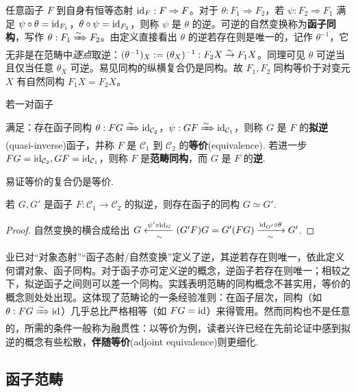 任意函子 $F$ 到自身有恒等态射 $\mathrm{id}_F : F \Rightarrow F$。对于 $\theta: F_1 \Rightarrow F_2$，若 $\psi: F_2 \Rightarrow F_1$ 满足 $\psi \circ \theta = \mathrm{id}_{F_1}$，$\theta \circ \psi = \mathrm{id}_{F_2}$，则称 $\psi$ 是 $\theta$ 的逆。可逆的自然变换称为\textbf{函子同构}，写作 $\theta: F_1 \xRightarrow{\sim} F_2$。由定义直接看出 $\theta$ 的逆若存在则是唯一的，记作 $\theta^{-1}$，它无非是在范畴中\emph{逐点}取逆：$(\theta^{-1})_X := (\theta_X)^{-1}: F_2 X \stackrel{\sim}{\rightarrow} F_1 X$。同理可见 $\theta$ 可逆当且仅当任意 $\theta_X$ 可逆。易见同构的纵横复合仍是同构。故 $F_1,F_2$ 同构等价于对变元 $X$ 有自然同构 $F_1 X= F_2 X$。

\begin{definition}
	若一对函子
	满足：存在函子同构 $\theta: FG \xRightarrow{\sim} \mathrm{id}_{\mathcal{C}_2}$，$\psi: GF \xRightarrow{\sim} \mathrm{id}_{\mathcal{C}_1}$，则称 $G$ 是 $F$ 的\textbf{拟逆}(quasi-inverse)函子，并称 $F$ 是 $\mathcal{C}_1$ 到 $\mathcal{C}_2$ 的\textbf{等价}(equivalence).
	若进一步 $FG = \mathrm{id}_{\mathcal{C}_2}, GF = \mathrm{id}_{\mathcal{C}_1}$，则称 $F$ 是\textbf{范畴同构}，而 $G$ 是 $F$ 的\textbf{逆}.
\end{definition}
易证等价的复合仍是等价.

\begin{proposition}
	若 $G, G'$ 是函子 $F: \mathcal{C}_1 \to \mathcal{C}_2$ 的拟逆，则存在函子的同构 $G \simeq G'$.
\end{proposition}
\begin{proof}
	自然变换的横合成给出 $G \xleftarrow[\sim]{\psi' \circ \mathrm{id}_G} (G'F)G = G'(FG) \xrightarrow[\sim]{\mathrm{id}_{G'} \circ \theta} G'$.
\end{proof}

\begin{remark}
	业已对“对象态射”“函子态射/自然变换”定义了逆，其逆若存在则唯一，依此定义何谓对象、函子同构。对于函子亦可定义逆的概念，逆函子若存在则唯一；相较之下，拟逆函子之间则可以差一个同构。实践表明范畴的同构概念不甚实用，等价的概念则处处出现。这体现了范畴论的一条经验准则：在函子层次，同构（如 $\theta: FG \xRightarrow{\sim} \mathrm{id}$）几乎总比严格相等（如 $FG = \mathrm{id}$）来得管用。然而同构也不是任意的，所需的条件一般称为融贯性：以等价为例，读者兴许已经在先前论证中感到拟逆的概念有些松散，\textbf{伴随等价}(adjoint equivalence)则更细化.
\end{remark}

\subsection{函子范畴}

